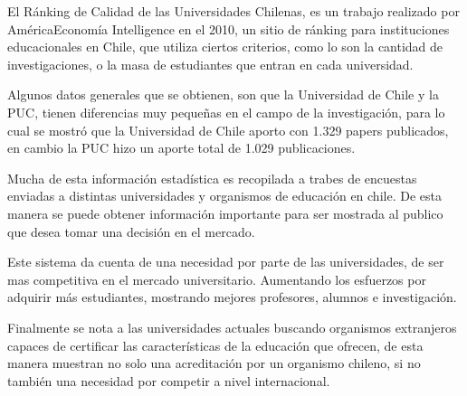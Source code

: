 \documentclass[a4paper,12pt,openany,oneside]{book}
\begin{document}
El Ránking de Calidad de las Universidades Chilenas, es un trabajo realizado por AméricaEconomía Intelligence en el 2010, un sitio de ránking para instituciones educacionales en Chile, que utiliza ciertos criterios, como lo son la cantidad de investigaciones, o la masa de estudiantes que entran en cada universidad.

Algunos datos generales que se obtienen, son que la Universidad de Chile y la PUC, tienen diferencias muy pequeñas en el campo de la investigación, para lo cual se mostró que la Universidad de Chile aporto con 1.329 papers publicados, en cambio la PUC hizo un aporte total de 1.029 publicaciones.

Mucha de esta información estadística es recopilada a trabes de encuestas enviadas a distintas universidades y organismos de educación en chile. De esta manera se puede obtener información importante para ser mostrada al publico que desea tomar una decisión en el mercado.

Este sistema da cuenta de una necesidad por parte de las universidades, de ser mas competitiva en el mercado universitario. Aumentando los esfuerzos por adquirir más estudiantes, mostrando mejores profesores, alumnos e investigación.

Finalmente se nota a las universidades actuales buscando organismos extranjeros capaces de certificar las características de la educación que ofrecen, de esta manera muestran no solo una acreditación por un organismo chileno, si no también una necesidad por competir a nivel internacional\cite{data3}.



\end{document}

